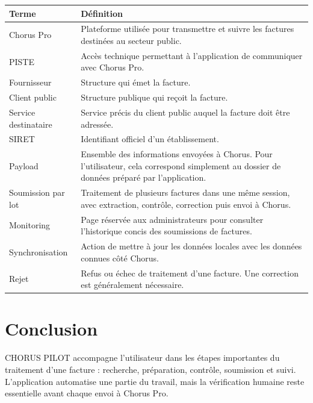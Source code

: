 \documentclass[11pt,a4paper]{article}
\begin{document}
\begin{longtable}{|p{}|p{}|}
  \hline
  \textbf{Terme} & \textbf{Définition} \\
  \hline
  Chorus Pro &
  Plateforme utilisée pour transmettre et suivre les factures destinées au secteur
  public. \\
  \hline
  PISTE &
  Accès technique permettant à l'application de communiquer avec Chorus Pro. \\
  \hline
  Fournisseur &
  Structure qui émet la facture. \\
  \hline
  Client public &
  Structure publique qui reçoit la facture. \\
  \hline
  Service destinataire &
  Service précis du client public auquel la facture doit être adressée. \\
  \hline
  SIRET &
  Identifiant officiel d'un établissement. \\
  \hline
  Payload &
  Ensemble des informations envoyées à Chorus. Pour l'utilisateur, cela correspond
  simplement au dossier de données préparé par l'application. \\
  \hline
  Soumission par lot &
  Traitement de plusieurs factures dans une même session, avec extraction,
  contrôle, correction puis envoi à Chorus. \\
  \hline
  Monitoring &
  Page réservée aux administrateurs pour consulter l'historique concis des
  soumissions de factures. \\
  \hline
  Synchronisation &
  Action de mettre à jour les données locales avec les données connues côté Chorus. \\
  \hline
  Rejet &
  Refus ou échec de traitement d'une facture. Une correction est généralement
  nécessaire. \\
  \hline
\end{longtable}

\section{Conclusion}

CHORUS PILOT accompagne l'utilisateur dans les étapes importantes du
traitement d'une facture : recherche, préparation, contrôle, soumission et suivi.
L'application automatise une partie du travail, mais la vérification humaine reste
essentielle avant chaque envoi à Chorus Pro.
\end{document}
